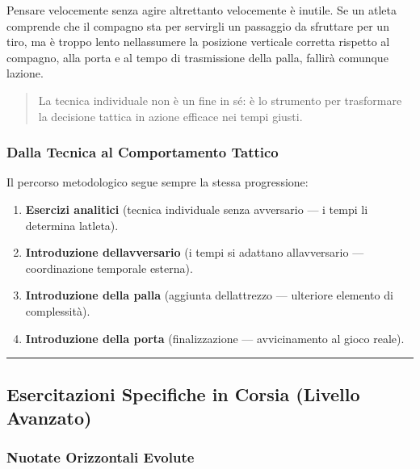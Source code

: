 \documentclass[a4paper,11pt]{article}
\providecommand{\tightlist}{%
  \setlength{\itemsep}{0pt}\setlength{\parskip}{0pt}}
\begin{document}
Pensare velocemente senza agire altrettanto velocemente è inutile. Se un
atleta comprende che il compagno sta per servirgli un passaggio da
sfruttare per un tiro, ma è troppo lento nell\textquotesingle assumere
la posizione verticale corretta rispetto al compagno, alla porta e al
tempo di trasmissione della palla, fallirà comunque
l\textquotesingle azione.

\begin{quote}
      La tecnica individuale non è un fine in sé: è lo strumento per
      trasformare la decisione tattica in azione efficace nei tempi giusti.
\end{quote}

\subsubsection{Dalla Tecnica al Comportamento
      Tattico}\label{dalla-tecnica-al-comportamento-tattico}

Il percorso metodologico segue sempre la stessa progressione:

\begin{enumerate}
      \tightlist
      \item
            \textbf{Esercizi analitici} (tecnica individuale senza avversario ---
            i tempi li determina l\textquotesingle atleta).
      \item
            \textbf{Introduzione dell\textquotesingle avversario} (i tempi si
            adattano all\textquotesingle avversario --- coordinazione temporale
            esterna).
      \item
            \textbf{Introduzione della palla} (aggiunta
            dell\textquotesingle attrezzo --- ulteriore elemento di complessità).
      \item
            \textbf{Introduzione della porta} (finalizzazione --- avvicinamento al
            gioco reale).
\end{enumerate}

\begin{center}\rule{0.5\linewidth}{0.5pt}\end{center}

\subsection{Esercitazioni Specifiche in Corsia (Livello
      Avanzato)}\label{esercitazioni-specifiche-in-corsia-livello-avanzato}

\subsubsection{Nuotate Orizzontali
      Evolute}\label{nuotate-orizzontali-evolute}
\end{document}

